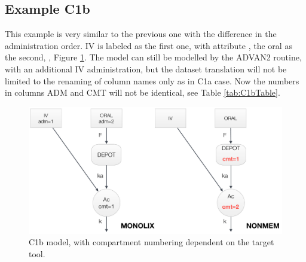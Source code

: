 \subsection{Example C1b}
This example is very similar to the previous one with the difference in the administration order.
IV is labeled as the first one, with attribute , the oral as the second, , 
Figure \ref{fig:ComplexModel1b}. The model can still be modelled by the ADVAN2 routine, 
with an additional IV administration, but the dataset \marginpar{\HandCuffLeft} translation 
will not be limited to the renaming of column names only as in C1a case. Now the numbers in 
columns ADM and CMT will not be identical, see Table \ref{tab:C1bTable}.

\begin{figure}[htbp!] 
\centering
 \includegraphics[width=130mm]{pics/ComplexModel1b}
\caption{C1b model, with compartment numbering dependent on the target tool.}
\label{fig:ComplexModel1b}
\end{figure}

